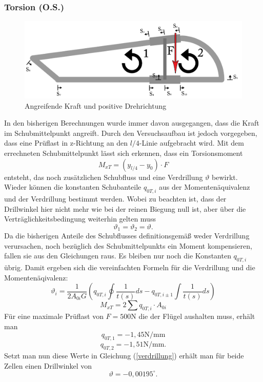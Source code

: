 \subsubsection{Torsion (O.S.)}
\begin{figure}[h]
	\centering
	\includegraphics[width=1\textwidth]{Bilder/Torsion}
	\caption{Angreifende Kraft und positive Drehrichtung}
\end{figure}
In den bisherigen Berechnungen wurde immer davon ausgegangen, dass die Kraft im Schubmittelpunkt angreift. Durch den Versuchsaufbau ist jedoch vorgegeben, dass eine Prüflast in z-Richtung an den $l/4$-Linie aufgebracht wird. Mit dem errechneten Schubmittelpunkt lässt sich erkennen, dass ein Torsionsmoment 
\begin{equation}
	M_{xT}=(y_{l/4}-y_{0})\cdot F
\end{equation}
entsteht, das noch zusätzlichen Schubfluss und eine Verdrillung $\vartheta$ bewirkt. Wieder können die konstanten Schubanteile $q_{0T,i}$ aus der Momentenäquivalenz und der Verdrillung bestimmt werden. Wobei zu beachten ist, dass der Drillwinkel hier nicht mehr wie bei der reinen Biegung null ist, aber über die Verträglichkeitsbedingung weiterhin gelten muss
\begin{equation}
	\vartheta_{1}=\vartheta_{2}=\vartheta.
\end{equation}
Da die bisherigen Anteile des Schubflusses definitionsgemäß weder Verdrillung verursachen, noch bezüglich des Schubmittelpunkts ein Moment kompensieren, fallen sie aus den Gleichungen raus. Es bleiben nur noch die Konstanten $q_{0T,i}$ übrig. Damit ergeben sich die vereinfachten Formeln für die Verdrillung und die Momentenäqivalenz:
\begin{equation}\label{verdrillung}
	\vartheta_{i} = \frac{1}{2A_{0i}G}(q_{0T,i}\oint\frac{1}{t(s)}ds-q_{0T,i\pm1}\int\frac{1}{t(s)}ds)
\end{equation}
\begin{equation}
		M_{xT}=2\sum q_{0T,i}\cdot A_{0i}
\end{equation}
Für eine maximale Prüflast von $F=500\mathrm{N}$ die der Flügel aushalten muss, erhält man
$$
	q_{0T,1}=-1,45\mathrm{N/mm}
$$
$$
	q_{0T,2}=-1,51\mathrm{N/mm}.
$$
Setzt man nun diese Werte in Gleichung (\ref{verdrillung}) erhält man für beide Zellen einen Drillwinkel von
$$
	\vartheta =-0,00195 ^\circ.
$$

